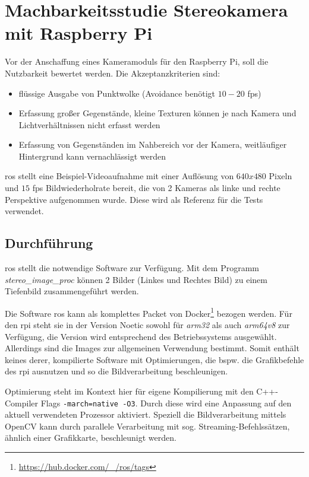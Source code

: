 \section{Machbarkeitsstudie Stereokamera mit Raspberry Pi}
Vor der Anschaffung eines Kameramoduls für den Raspberry Pi, soll die Nutzbarkeit bewertet werden. Die Akzeptanzkriterien sind:
\begin{itemize}
    \item flüssige Ausgabe von Punktwolke (Avoidance benötigt $10-20$ \gls{fps})
    \item Erfassung großer Gegenstände, kleine Texturen können je nach Kamera und Lichtverhältnissen nicht erfasst werden
    \item Erfassung von Gegenständen im Nahbereich vor der Kamera, weitläufiger Hintergrund kann vernachlässigt werden
\end{itemize}

\acrshort{ros} stellt eine Beispiel-Videoaufnahme mit einer Auflösung von $640x480$ Pixeln und $15$ \gls{fps} Bildwiederholrate bereit, die von 2 Kameras als linke und rechte Perspektive aufgenommen wurde. Diese wird als Referenz für die Tests verwendet.

\subsection*{Durchführung}
\acrshort{ros} stellt die notwendige Software zur Verfügung. Mit dem Programm \textit{stereo\_image\_proc} können 2 Bilder (Linkes und Rechtes Bild) zu einem Tiefenbild zusammengeführt werden.

Die Software \acrshort{ros} kann als komplettes Packet von Docker\footnote{\url{https://hub.docker.com/_/ros/tags}} bezogen werden. Für den \gls{rpi} steht sie in der Version Noetic sowohl für \textit{arm32} als auch \textit{arm64v8} zur Verfügung, die Version wird entsprechend des Betriebssystems ausgewählt. Allerdings sind die Images zur allgemeinen Verwendung bestimmt. Somit enthält keines derer, kompilierte Software mit Optimierungen, die bspw. die Grafikbefehle des \gls{rpi} ausnutzen und so die Bildverarbeitung beschleunigen.

Optimierung steht im Kontext hier für eigene Kompilierung mit den C++-Compiler Flags \texttt{-march=native -O3}. Durch diese wird eine Anpassung auf den aktuell verwendeten Prozessor aktiviert. Speziell die Bildverarbeitung mittels OpenCV kann durch parallele Verarbeitung mit sog. Streaming-Befehlssätzen, ähnlich einer Grafikkarte, beschleunigt werden.

